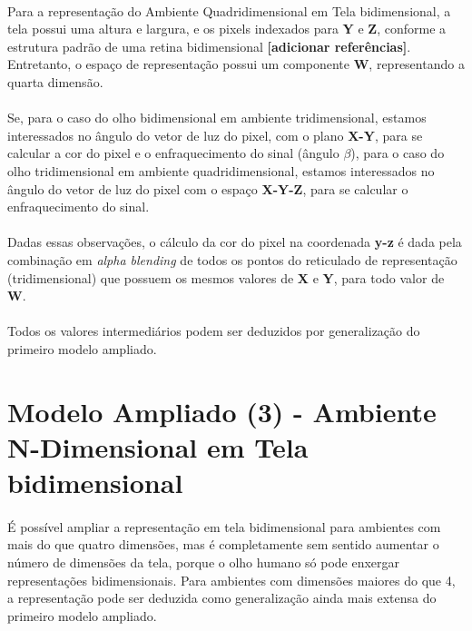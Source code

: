 \documentclass{article}
\begin{document}
	\paragraph{}
	Para a representação do Ambiente Quadridimensional em Tela bidimensional, a tela possui uma altura e largura, e os pixels indexados para \textbf{Y} e \textbf{Z}, conforme a estrutura padrão de uma retina bidimensional \textbf{[adicionar referências]}. Entretanto, o espaço de representação possui um componente \textbf{W}, representando a quarta dimensão.
	
	\paragraph{}
	Se, para o caso do olho bidimensional em ambiente tridimensional, estamos interessados no ângulo do vetor de luz do pixel, com o plano \textbf{X-Y}, para se calcular a cor do pixel e o enfraquecimento do sinal (ângulo $\beta$), para o caso do olho tridimensional em ambiente quadridimensional, estamos interessados no ângulo do vetor de luz do pixel com o espaço \textbf{X-Y-Z}, para se calcular o enfraquecimento do sinal.
	
	\paragraph{}
	Dadas essas observações, o cálculo da cor do pixel na coordenada \textbf{y-z} é dada pela combinação em \textit{alpha blending} de todos os pontos do reticulado de representação (tridimensional) que possuem os mesmos valores de \textbf{X} e \textbf{Y}, para todo valor de \textbf{W}.
	
	\paragraph{}
	Todos os valores intermediários podem ser deduzidos por generalização do primeiro modelo ampliado.
	
	\section{Modelo Ampliado (3) - Ambiente N-Dimensional em Tela bidimensional}
	
	\paragraph{}
	É possível ampliar a representação em tela bidimensional para ambientes com mais do que quatro dimensões, mas é completamente sem sentido aumentar o número de dimensões da tela, porque o olho humano só pode enxergar representações bidimensionais. Para ambientes com dimensões maiores do que 4, a representação pode ser deduzida como generalização ainda mais extensa do primeiro modelo ampliado.
	
\end{document}

